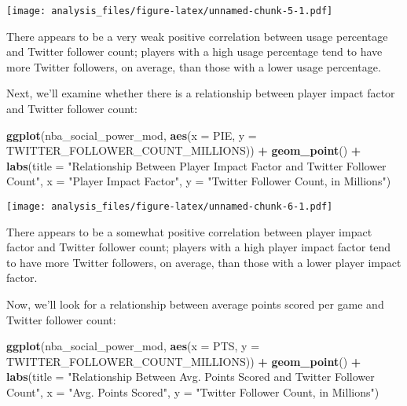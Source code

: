 \documentclass[]{article}
\newenvironment{Shaded}{\begin{snugshade}}{\end{snugshade}}
\newcommand{\DataTypeTok}[1]{\textcolor[rgb]{0.13,0.29,0.53}{#1}}
\newcommand{\KeywordTok}[1]{\textcolor[rgb]{0.13,0.29,0.53}{\textbf{#1}}}
\newcommand{\NormalTok}[1]{#1}
\newcommand{\OperatorTok}[1]{\textcolor[rgb]{0.81,0.36,0.00}{\textbf{#1}}}
\newcommand{\StringTok}[1]{\textcolor[rgb]{0.31,0.60,0.02}{#1}}
\begin{document}
\texttt{[image: analysis\_files/figure-latex/unnamed-chunk-5-1.pdf]}

There appears to be a very weak positive correlation between usage
percentage and Twitter follower count; players with a high usage
percentage tend to have more Twitter followers, on average, than those
with a lower usage percentage.

Next, we'll examine whether there is a relationship between player
impact factor and Twitter follower count:

\begin{Shaded}
\begin{Highlighting}[]
\KeywordTok{ggplot}\NormalTok{(nba_social_power_mod, }
       \KeywordTok{aes}\NormalTok{(}\DataTypeTok{x =}\NormalTok{ PIE, }\DataTypeTok{y =}\NormalTok{ TWITTER_FOLLOWER_COUNT_MILLIONS)) }\OperatorTok{+}\StringTok{ }
\StringTok{  }\KeywordTok{geom_point}\NormalTok{() }\OperatorTok{+}\StringTok{ }
\StringTok{  }\KeywordTok{labs}\NormalTok{(}\DataTypeTok{title =} \StringTok{"Relationship Between Player Impact Factor and Twitter Follower Count"}\NormalTok{,}
       \DataTypeTok{x =} \StringTok{"Player Impact Factor"}\NormalTok{,}
       \DataTypeTok{y =} \StringTok{"Twitter Follower Count, in Millions"}\NormalTok{)}
\end{Highlighting}
\end{Shaded}

\texttt{[image: analysis\_files/figure-latex/unnamed-chunk-6-1.pdf]}

There appears to be a somewhat positive correlation between player
impact factor and Twitter follower count; players with a high player
impact factor tend to have more Twitter followers, on average, than
those with a lower player impact factor.

Now, we'll look for a relationship between average points scored per
game and Twitter follower count:

\begin{Shaded}
\begin{Highlighting}[]
\KeywordTok{ggplot}\NormalTok{(nba_social_power_mod,}
       \KeywordTok{aes}\NormalTok{(}\DataTypeTok{x =}\NormalTok{ PTS, }\DataTypeTok{y =}\NormalTok{ TWITTER_FOLLOWER_COUNT_MILLIONS)) }\OperatorTok{+}\StringTok{ }
\StringTok{  }\KeywordTok{geom_point}\NormalTok{() }\OperatorTok{+}\StringTok{ }
\StringTok{  }\KeywordTok{labs}\NormalTok{(}\DataTypeTok{title =} \StringTok{"Relationship Between Avg. Points Scored and Twitter Follower Count"}\NormalTok{,}
       \DataTypeTok{x =} \StringTok{"Avg. Points Scored"}\NormalTok{,}
       \DataTypeTok{y =} \StringTok{"Twitter Follower Count, in Millions"}\NormalTok{)}
\end{Highlighting}
\end{Shaded}
\end{document}
